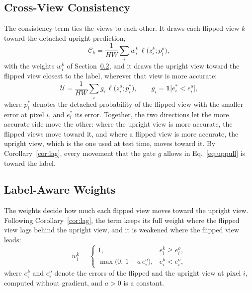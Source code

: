 \subsection{Cross-View Consistency}
\label{sec:flippull}

The consistency term ties the views to each other. It draws each flipped view $k$ toward the detached
upright prediction,
\begin{equation}
\mathcal{C}_k=\frac{1}{HW}\sum_{i} w^{k}_i\,\ell\big(z^{k}_i;p^{o}_i\big),
\label{eq:flippull}
\end{equation}
with the weights $w^{k}_i$ of Section~\ref{sec:weights}, and it draws the upright view toward the flipped
view closest to the label, wherever that view is more accurate:
\begin{equation}
\mathcal{U}=\frac{1}{HW}\sum_{i} g_i\,\ell\big(z^{o}_i;p^{\ast}_i\big),\qquad g_i=\mathbf{1}\big[e^{\ast}_i<e^{o}_i\big],
\label{eq:uppull}
\end{equation}
where $p^{\ast}_i$ denotes the detached probability of the flipped view with the smaller error at
pixel $i$, and $e^{\ast}_i$ its error. Together, the two directions let the more accurate side move the
other: where the upright view is more accurate, the flipped views move toward it, and where a flipped
view is more accurate, the upright view, which is the one used at test time, moves toward it. By
Corollary~\ref{cor:lag}, every movement that the gate $g$ allows in Eq.~\eqref{eq:uppull} is toward the
label.

\subsection{Label-Aware Weights}
\label{sec:weights}

The weights decide how much each flipped view moves toward the upright view. Following
Corollary~\ref{cor:lag}, the term keeps its full weight where the flipped view lags behind the upright
view, and it is weakened where the flipped view leads:
\begin{equation}
w^{k}_i=\begin{cases}1, & e^{k}_i\geq e^{o}_i,\\ \max\big(0,\,1-a\,e^{o}_i\big), & e^{k}_i<e^{o}_i,\end{cases}
\label{eq:weight}
\end{equation}
where $e^{k}_i$ and $e^{o}_i$ denote the errors of the flipped and the upright view at pixel $i$, computed
without gradient, and $a>0$ is a constant.

